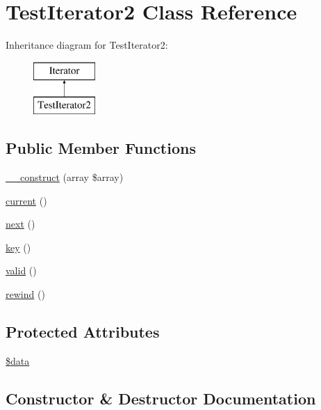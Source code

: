 \hypertarget{class_test_iterator2}{}\section{Test\+Iterator2 Class Reference}
\label{class_test_iterator2}
Inheritance diagram for Test\+Iterator2\+:\begin{figure}[H]
\begin{center}
\leavevmode
\includegraphics[height=2.000000cm]{class_test_iterator2}
\end{center}
\end{figure}
\subsection*{Public Member Functions}
\begin{DoxyCompactItemize}
\item 
\mbox{\hyperlink{class_test_iterator2_ad1a4b58d02ebb0b54083b97984bfc1fd}{\+\_\+\+\_\+construct}} (array \$array)
\item 
\mbox{\hyperlink{class_test_iterator2_af343507d1926e6ecf964625d41db528c}{current}} ()
\item 
\mbox{\hyperlink{class_test_iterator2_acea62048bfee7b3cd80ed446c86fb78a}{next}} ()
\item 
\mbox{\hyperlink{class_test_iterator2_a729e946b4ef600e71740113c6d4332c0}{key}} ()
\item 
\mbox{\hyperlink{class_test_iterator2_abb9f0d6adf1eb9b3b55712056861a247}{valid}} ()
\item 
\mbox{\hyperlink{class_test_iterator2_ae619dcf2218c21549cb65d875bbc6c9c}{rewind}} ()
\end{DoxyCompactItemize}
\subsection*{Protected Attributes}
\begin{DoxyCompactItemize}
\item 
\mbox{\hyperlink{class_test_iterator2_a6efc15b5a2314dd4b5aaa556a375c6d6}{\$data}}
\end{DoxyCompactItemize}


\subsection{Constructor \& Destructor Documentation}
\mbox{\label{class_test_iterator2_ad1a4b58d02ebb0b54083b97984bfc1fd}} 
